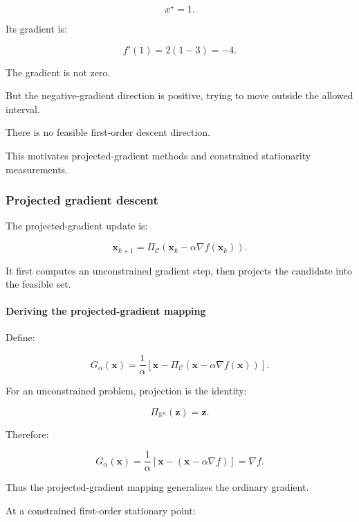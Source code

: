 \[
\boxed{x^\star=1}.
\]

Its gradient is:

\[
f'(1)=2(1-3)=-4.
\]

The gradient is not zero.

But the negative-gradient direction is positive, trying to move outside the allowed interval.

There is no feasible first-order descent direction.

This motivates projected-gradient methods and constrained stationarity measurements.

\subsubsection{Projected gradient descent}\label{02-foundations-ii-ch027-projected-gradient-descent}

\hypertarget{02-foundations-ii-ch027-projected-gradient-descent}{}

The projected-gradient update is:

\[
\boxed{ \mathbf x_{k+1} = \Pi_{\mathcal C} \left( \mathbf x_k-\alpha\nabla f(\mathbf x_k) \right) }.
\]

It first computes an unconstrained gradient step, then projects the candidate into the feasible set.

\paragraph{Deriving the projected-gradient mapping}\label{02-foundations-ii-ch027-deriving-the-projected-gradient-mapping}

\hypertarget{02-foundations-ii-ch027-deriving-the-projected-gradient-mapping}{}

Define:

\[
\boxed{ G_\alpha(\mathbf x)= \frac1\alpha \left[ \mathbf x- \Pi_{\mathcal C} (\mathbf x-\alpha\nabla f(\mathbf x)) \right] }.
\]

For an unconstrained problem, projection is the identity:

\[
\Pi_{\mathbb R^n}(\mathbf z)=\mathbf z.
\]

Therefore:

\[
G_\alpha(\mathbf x) = \frac1\alpha[ \mathbf x-(\mathbf x-\alpha\nabla f) ] = \nabla f.
\]

Thus the projected-gradient mapping generalizes the ordinary gradient.

At a constrained first-order stationary point:

